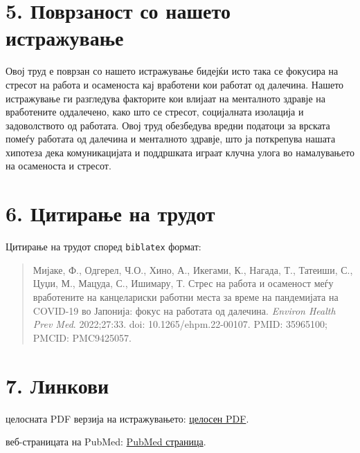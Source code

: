 \documentclass[12pt]{article}
\begin{document}
\section*{5. Поврзаност со нашето истражување}
Овој труд е поврзан со нашето истражување бидејќи исто така се фокусира на стресот на работа и осаменоста кај вработени кои работат од далечина. Нашето истражување ги разгледува факторите кои влијаат на менталното здравје на вработените оддалечено, како што се стресот, социјалната изолација и задоволството од работата. Овој труд обезбедува вредни податоци за врската помеѓу работата од далечина и менталното здравје, што ја поткрепува нашата хипотеза дека комуникацијата и поддршката играат клучна улога во намалувањето на осаменоста и стресот.

\section*{6. Цитирање на трудот}

Цитирање на трудот според \texttt{biblatex} формат:

\begin{quote}
Мијаке, Ф., Одгерел, Ч.О., Хино, А., Икегами, К., Нагада, Т., Татеиши, С., Цуџи, М., Мацуда, С., Ишимару, Т. Стрес на работа и осаменост меѓу вработените на канцелариски работни места за време на пандемијата на COVID-19 во Јапонија: фокус на работата од далечина. \textit{Environ Health Prev Med}. 2022;27:33. doi: 10.1265/ehpm.22-00107. PMID: 35965100; PMCID: PMC9425057.
\end{quote}

\section*{7. Линкови}
целосната PDF верзија на истражувањето: \href{https://pmc.ncbi.nlm.nih.gov/articles/PMC9425057/pdf/ehpm-27-033.pdf}{целосен PDF}.

веб-страницата на PubMed: \href{https://pubmed.ncbi.nlm.nih.gov/35965100/}{PubMed страница}.

\newpage

\printbibliography %
\end{document}
